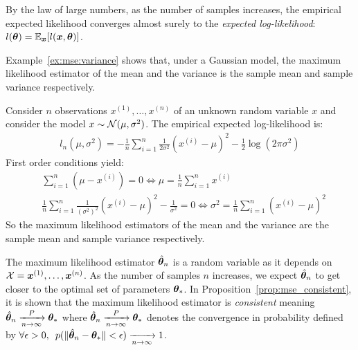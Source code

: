 By the law of large numbers, as the number of samples increases, the empirical
expected likelihood converges almost surely to the \emph{expected
  log-likelihood}: $l(\boldsymbol{\theta}) = \mathbb{E}_{\boldsymbol{x}}[l(\boldsymbol{x}, \boldsymbol{\theta})]$.

Example~\ref{ex:mse:variance} shows that, under a Gaussian model, the maximum likelihood estimator of the
mean and the variance is the sample mean and sample variance respectively.
\begin{example}
  \label{ex:mse:variance}
  Consider $n$ observations $x^{(1)}, \dots, x^{(n)}$ of an unknown random variable $x$
  and consider the model $x \sim \mathcal{N}(\mu, \sigma^2)$.
  The empirical expected log-likelihood is:
  \begin{align}
    l_n(\mu, \sigma^2) = -\frac1{n} \sum_{i=1}^n \frac1{2 \sigma^2}(x^{(i)} - \mu)^2 - \frac12 \log(2\pi \sigma^2)
  \end{align}
  First order conditions
  yield:
  \begin{align}
    &\sum_{i=1}^n (\mu - x^{(i)}) = 0 \iff \mu = \frac1{n} \sum_{i=1}^n x^{(i)} \\
    &\frac1{n} \sum_{i=1}^n \frac1{(\sigma^2)^2}(x^{(i)} - \mu)^2 - \frac1{\sigma^2} = 0 \iff \sigma^2 = \frac1{n} \sum_{i=1}^n(x^{(i)} - \mu)^2
  \end{align}
  So the maximum likelihood estimators of the mean and the variance are the
  sample mean and sample variance respectively.
\end{example}

The maximum likelihood estimator $\hat{\boldsymbol{\theta}}_n$ is a random variable as it depends on
$\mathcal{X} = \boldsymbol{x}^{(1)}, \dots, \boldsymbol{x}^{(n)}$. As the number of samples $n$ increases,
we expect $\hat{\boldsymbol{\theta}}_n$ to get closer to the optimal set of parameters
$\boldsymbol{\theta}_*$.
In Proposition~\ref{prop:mse_consistent}, it is shown that the
maximum likelihood estimator is \emph{consistent} meaning $\hat{\boldsymbol{\theta}}_n
\xrightarrow[n \rightarrow \infty]{P}  \boldsymbol{\theta}_*$ where $\hat{\boldsymbol{\theta}}_n
\xrightarrow[n \rightarrow \infty]{P}  \boldsymbol{\theta}_*$ denotes the convergence in
probability defined by $\forall \epsilon > 0, \enspace p(\| \hat{\boldsymbol{\theta}}_n - \boldsymbol{\theta}_* \| < \epsilon) \xrightarrow[n \rightarrow \infty]{} 1$. 

